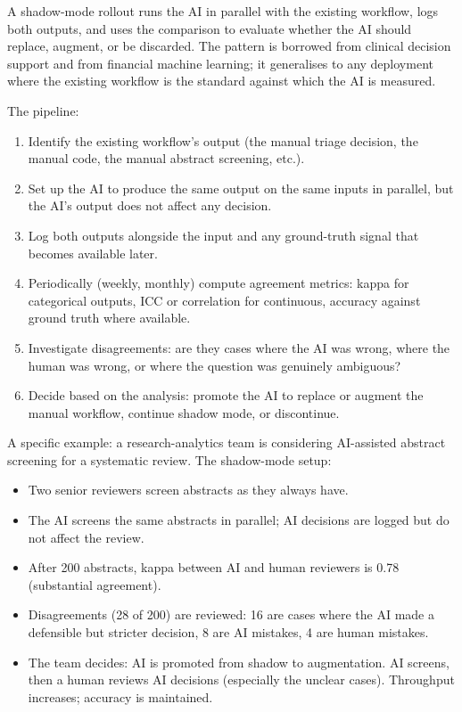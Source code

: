 \documentclass[
  letterpaper,
  11pt]{scrbook}
\providecommand{\tightlist}{%
  \setlength{\itemsep}{0pt}\setlength{\parskip}{0pt}}
\begin{document}
A shadow-mode rollout runs the AI in parallel with the existing
workflow, logs both outputs, and uses the comparison to evaluate whether
the AI should replace, augment, or be discarded. The pattern is borrowed
from clinical decision support and from financial machine learning; it
generalises to any deployment where the existing workflow is the
standard against which the AI is measured.

The pipeline:

\begin{enumerate}
\def\labelenumi{\arabic{enumi}.}
\tightlist
\item
  Identify the existing workflow's output (the manual triage decision,
  the manual code, the manual abstract screening, etc.).
\item
  Set up the AI to produce the same output on the same inputs in
  parallel, but the AI's output does not affect any decision.
\item
  Log both outputs alongside the input and any ground-truth signal that
  becomes available later.
\item
  Periodically (weekly, monthly) compute agreement metrics: kappa for
  categorical outputs, ICC or correlation for continuous, accuracy
  against ground truth where available.
\item
  Investigate disagreements: are they cases where the AI was wrong,
  where the human was wrong, or where the question was genuinely
  ambiguous?
\item
  Decide based on the analysis: promote the AI to replace or augment the
  manual workflow, continue shadow mode, or discontinue.
\end{enumerate}

A specific example: a research-analytics team is considering AI-assisted
abstract screening for a systematic review. The shadow-mode setup:

\begin{itemize}
\tightlist
\item
  Two senior reviewers screen abstracts as they always have.
\item
  The AI screens the same abstracts in parallel; AI decisions are logged
  but do not affect the review.
\item
  After 200 abstracts, kappa between AI and human reviewers is 0.78
  (substantial agreement).
\item
  Disagreements (28 of 200) are reviewed: 16 are cases where the AI made
  a defensible but stricter decision, 8 are AI mistakes, 4 are human
  mistakes.
\item
  The team decides: AI is promoted from shadow to augmentation. AI
  screens, then a human reviews AI decisions (especially the unclear
  cases). Throughput increases; accuracy is maintained.
\end{itemize}
\end{document}
